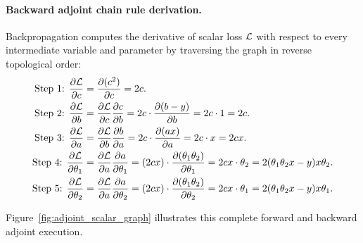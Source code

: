 \documentclass[../../main.tex]{subfiles}
\begin{document}
\paragraph{Backward adjoint chain rule derivation.}
Backpropagation computes the derivative of scalar loss $\mathcal{L}$ with respect to every intermediate variable and parameter by traversing the graph in reverse topological order:
\begin{align}
\text{Step 1: } \frac{\partial \mathcal{L}}{\partial c} &= \frac{\partial (c^2)}{\partial c} = 2c. \label{eq:bwd_c} \\
\text{Step 2: } \frac{\partial \mathcal{L}}{\partial b} &= \frac{\partial \mathcal{L}}{\partial c} \frac{\partial c}{\partial b} = 2c \cdot \frac{\partial (b - y)}{\partial b} = 2c \cdot 1 = 2c. \label{eq:bwd_b} \\
\text{Step 3: } \frac{\partial \mathcal{L}}{\partial a} &= \frac{\partial \mathcal{L}}{\partial b} \frac{\partial b}{\partial a} = 2c \cdot \frac{\partial (a x)}{\partial a} = 2c \cdot x = 2cx. \label{eq:bwd_a} \\
\text{Step 4: } \frac{\partial \mathcal{L}}{\partial \theta_1} &= \frac{\partial \mathcal{L}}{\partial a} \frac{\partial a}{\partial \theta_1} = (2cx) \cdot \frac{\partial (\theta_1 \theta_2)}{\partial \theta_1} = 2cx \cdot \theta_2 = 2(\theta_1 \theta_2 x - y) x \theta_2. \label{eq:bwd_theta1} \\
\text{Step 5: } \frac{\partial \mathcal{L}}{\partial \theta_2} &= \frac{\partial \mathcal{L}}{\partial a} \frac{\partial a}{\partial \theta_2} = (2cx) \cdot \frac{\partial (\theta_1 \theta_2)}{\partial \theta_2} = 2cx \cdot \theta_1 = 2(\theta_1 \theta_2 x - y) x \theta_1. \label{eq:bwd_theta2}
\end{align}

Figure~\ref{fig:adjoint_scalar_graph} illustrates this complete forward and backward adjoint execution.
\end{document}
